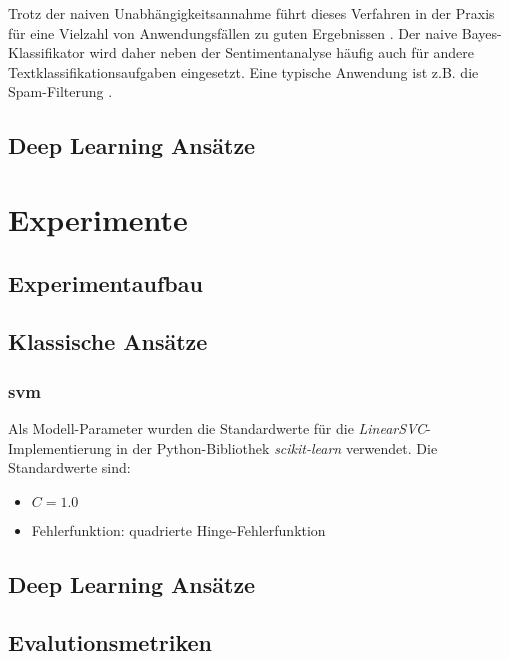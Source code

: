 \documentclass[researchlab,group,]{AIGpaper}
\begin{document}
Trotz der naiven Unabhängigkeitsannahme führt dieses Verfahren in der Praxis für eine Vielzahl von Anwendungsfällen zu guten Ergebnissen \cite{hand2001idiot}. Der naive Bayes-Klassifikator wird daher neben der Sentimentanalyse häufig auch für andere Textklassifikationsaufgaben eingesetzt. Eine typische Anwendung ist z.B. die Spam-Filterung \cite{sahami1998bayesian}.

\subsection{Deep Learning Ansätze}

\section{Experimente}

\subsection{Experimentaufbau}

\subsection{Klassische Ansätze}

\subsubsection{\gls{svm}}

Als Modell-Parameter wurden die Standardwerte für die \textit{LinearSVC}-Implementierung in der Python-Bibliothek \textit{scikit-learn} verwendet.
Die Standardwerte sind:

\begin{itemize}
    \item $C = 1.0$
    \item Fehlerfunktion: quadrierte Hinge-Fehlerfunktion
\end{itemize}

\subsection{Deep Learning Ansätze}

\subsection{Evalutionsmetriken}
\end{document}
